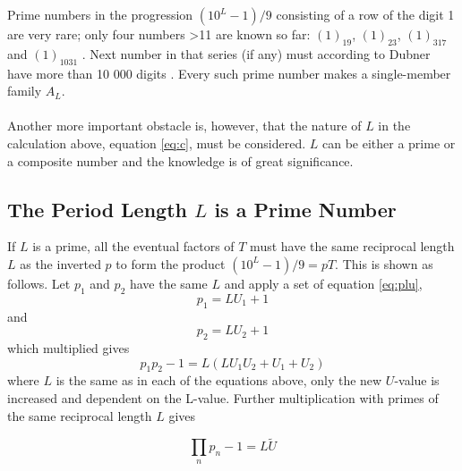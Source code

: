 \documentclass[10pt,twoside,a4paper]{amsart}
\begin{document}
Prime numbers in the progression $(10^{L} - 1)/9$ consisting of a row of the digit 1 are very rare; only four numbers {\textgreater}11 are known so far: $(1)_{19}$, $(1)_{23}$, $(1)_{317}$ and $(1)_{1031}$ \cite{Ribenboim}. Next number in that series (if any) must according to Dubner have more than 10 000 digits \cite{Dubner}. Every such prime number makes a single-member family $A_{L}$.\\
\\
Another more important obstacle is, however, that the nature of $L$ in the calculation above, equation \ref{eq:c}, must be considered. $L$ can be either a prime or a composite number and the knowledge is of great significance.

\subsection{The Period Length $L$ is a Prime Number}

If $L$ is a prime, all the eventual factors of $T$ must have the same reciprocal length $L$ as the inverted $p$ to form the product $(10^{L}-1)/9 = pT$. This is shown as follows. Let $p_{1}$ and $p_{2}$ have the same $L$ and apply a set of equation \ref{eq:plu},
\begin{equation*}
p_{1} = LU_{1} + 1
\end{equation*}
and
\begin{equation*}
p_{2} = LU_{2} + 1
\end{equation*}
which multiplied gives
\begin{equation*}
p_{1}p_{2}-1 = L(LU_{1}U_{2} + U_{1} + U_{2})
\end{equation*}
where $L$ is the same as in each of the equations above, only the new $U$-value is increased and dependent on the L-value. Further multiplication with primes of the same reciprocal length $L$ gives

\begin{equation}
\label{eq:prodlu}
\prod_{n}p_{n}-1 = L\tilde{U}
\end{equation}
\end{document}
